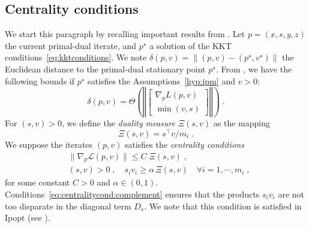 \subsection{Centrality conditions}
We start this paragraph by recalling important results from
\cite{wright2001effects}.
Let $p = (x, s, y, z)$ the current primal-dual iterate,
and $p^\star$ a solution of the KKT conditions~\eqref{eq:kktconditions}.
We note $\delta(p, v) = \| (p, v) - (p^\star, v^\star) \|$ the Euclidean distance to the
primal-dual stationary point $p^\star$.
From \cite[Theorem 2.2]{wright2001effects}, we have the following bounds
if $p^\star$ satisfies the Assumptions~\ref{hyp:ipm} and $v > 0$:
\begin{equation}
  \delta(p, v) = \Theta\left( \left\Vert \begin{bmatrix}
      \nabla_p L(p, v) \\ \min(v, s)
  \end{bmatrix}
  \right\Vert \right) \; .
\end{equation}
For $(s, v) > 0$, we define the \emph{duality measure} $\Xi(s, v)$ as the mapping
\begin{equation}
  \Xi(s, v) = s^\top v / m_i \; .
\end{equation}
We suppose the iterates $(p, v)$ satisfies the \emph{centrality conditions}
\begin{subequations}
  \label{eq:centralitycond}
  \begin{align}
    & \| \nabla_p \mathcal{L}(p, v) \| \leq C \; \Xi(s, v) \;,  \\
    \label{eq:centralitycond:complement}
    & (s, v) > 0 \;,\quad s_i v_i \geq \alpha \, \Xi(s, v) \quad \forall i =1, \cdots, m_i \; ,
  \end{align}
\end{subequations}
for some constant $C > 0$ and $\alpha \in (0, 1)$.
Conditions~\eqref{eq:centralitycond:complement} ensures that the products
$s_i v_i$ are not too disparate in the diagonal term $D_s$.
We note that this condition is satisfied in Ipopt (see \cite[Equation (16)]{wachter2006implementation}).

